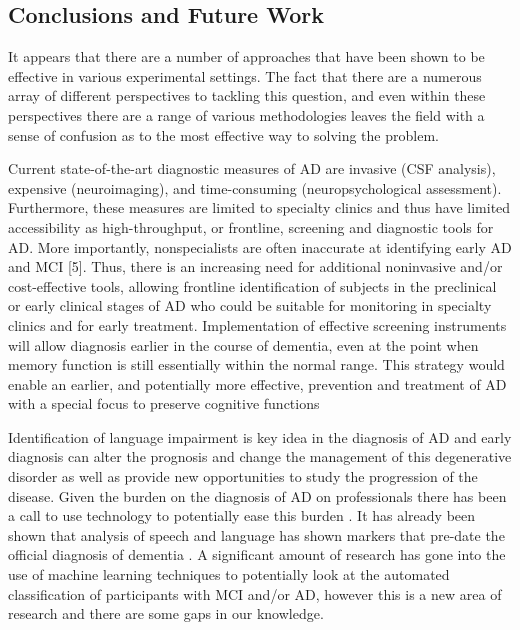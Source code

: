\documentclass{article}
\begin{document}
\subsection{Conclusions and Future Work}
It appears that there are a number of approaches that have been shown to be effective in various experimental settings. The fact that there are a numerous array of different perspectives to tackling this question, and even within these perspectives there are a range of various methodologies leaves the field with a sense of confusion as to the most effective way to solving the problem. \newline
\par
Current state-of-the-art diagnostic measures of AD are invasive (CSF analysis), expensive (neuroimaging), and time-consuming (neuropsychological assessment). Furthermore, these measures are limited to specialty clinics and thus have limited accessibility as high-throughput, or frontline, screening and diagnostic tools for AD. More importantly, nonspecialists are often inaccurate at identifying early AD and MCI [5]. Thus, there is an increasing need for additional noninvasive and/or cost-effective tools, allowing frontline identification of subjects in the preclinical or early clinical stages of AD who could be suitable for monitoring in specialty clinics and for early treatment. Implementation of effective screening instruments will allow diagnosis earlier in the course of dementia, even at the point when memory function is still essentially within the normal range. This strategy would enable an earlier, and potentially more effective, prevention and treatment of AD with a special focus to preserve cognitive functions \newline
\par
Identification of language impairment is key idea in the diagnosis of AD and early diagnosis can alter the prognosis and change the management of this degenerative disorder as well as provide new opportunities to study the progression of the disease. Given the burden on the diagnosis of AD on professionals there has been a call to use technology to potentially ease this burden \cite{Boschi2017}. It has already been shown that analysis of speech and language has shown markers that pre-date the official diagnosis of dementia \cite{Snowdon1996, Berisha2015}. A significant amount of research has gone into the use of machine learning techniques to potentially look at the automated classification of participants with MCI and/or AD, however this is a new area of research and there are some gaps in our knowledge. \newline
\end{document}
